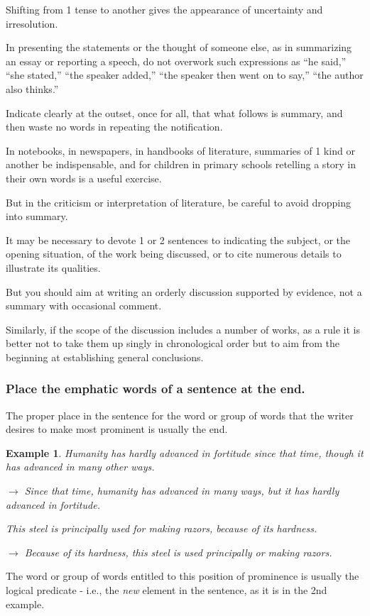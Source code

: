 \documentclass{article}
\newtheorem{example}{Example}
\begin{document}
Shifting from 1 tense to another gives the appearance of uncertainty and irresolution.

%
In presenting the statements or the thought of someone else, as in summarizing an essay or reporting a speech, do not overwork such expressions as ``he said,'' ``she stated,'' ``the speaker added,'' ``the speaker then went on to say,'' ``the author also thinks.''

Indicate clearly at the outset, once for all, that what follows is summary, and then waste no words in repeating the notification.

%
In notebooks, in newspapers, in handbooks of literature, summaries of 1 kind or another be indispensable, and for children in primary schools retelling a story in their own words is a useful exercise.

But in the criticism or interpretation of literature, be careful to avoid dropping into summary.

It may be necessary to devote 1 or 2 sentences to indicating the subject, or the opening situation, of the work being discussed, or to cite numerous details to illustrate its qualities.

But you should aim at writing an orderly discussion supported by evidence, not a summary with occasional comment.

Similarly, if the scope of the discussion includes a number of works, as a rule it is better not to take them up singly in chronological order but to aim from the beginning at establishing general conclusions.


\subsubsection{Place the emphatic words of a sentence at the end.}
The proper place in the sentence for the word or group of words that the writer desires to make most prominent is usually the end.
\begin{example}
	Humanity has hardly advanced in fortitude since that time, though it has advanced in many other ways.
	
	$\to$ Since that time, humanity has advanced in many ways, but it has hardly advanced in fortitude.
	
	This steel is principally used for making razors, because of its hardness.
	
	$\to$ Because of its hardness, this steel is used principally or making razors.
\end{example}
The word or group of words entitled to this position of prominence is usually the logical predicate - i.e., the {\it new} element in the sentence, as it is in the 2nd example.
\end{document}
